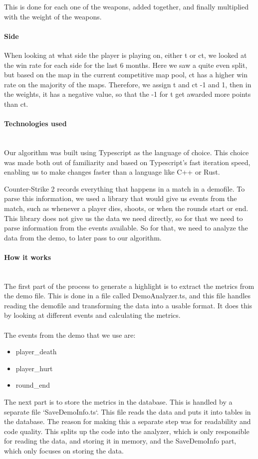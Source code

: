 This is done for each one of the weapons, added together, and finally multiplied with the weight of the weapons.


\paragraph{Side}
When looking at what side the player is playing on, either \acrshort{t} or \acrshort{ct}, we looked at the win rate for each side for the last 6 months\cite{hltvMapStats}. Here we saw a quite even split, but based on the map in the current competitive map pool, \acrshort{ct} has a higher win rate on the majority of the maps. Therefore, we assign \acrshort{t} and \acrshort{ct} -1 and 1, then in the weights, it has a negative value, so that the -1 for \acrshort{t} get awarded more points than \acrshort{ct}.


\paragraph{Technologies used}\mbox{}\\
Our algorithm was built using Typescript as the language of choice. This choice was made both out of familiarity and based on Typescript's fast iteration speed, enabling us to make changes faster than a language like C++ or Rust.

Counter-Strike 2 records everything that happens in a match in a \gls{demofile}. To parse this information, we used a library\cite{demoparser} that would give us events from the match, such as whenever a player dies, shoots, or when the rounds start or end. This library does not give us the data we need directly, so for that we need to parse information from the events available. So for that, we need to analyze the data from the demo, to later pass to our algorithm.
\paragraph{How it works}\mbox{}\\
The first part of the process to generate a highlight is to extract the metrics from the demo file. This is done in a file called DemoAnalyzer.ts, and this file handles reading the \gls{demofile} and transforming the data into a usable format. It does this by looking at different events and calculating the metrics.\\\\
The events from the demo that we use are:

\begin{itemize}
    \item player\_death
    \item player\_hurt
    \item round\_end
\end{itemize}
The next part is to store the metrics in the database. This is handled by a separate file `SaveDemoInfo.ts`. This file reads the data and puts it into tables in the database. The reason for making this a separate step was for readability and code quality. This splits up the code into the analyzer, which is only responsible for reading the data, and storing it in memory, and the SaveDemoInfo part, which only focuses on storing the data. 

